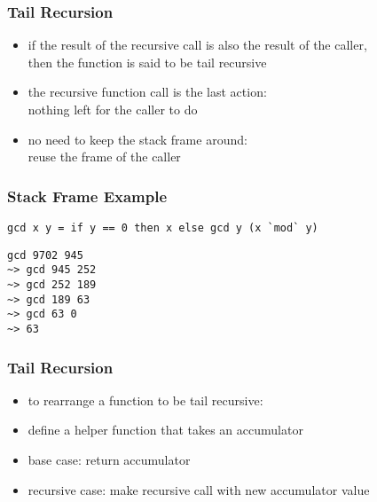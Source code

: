 \documentclass[dvipsnames]{beamer}
\theoremstyle{plain}
\begin{document}
\begin{frame}
  \frametitle{Tail Recursion}

  \begin{itemize}
    \item if the result of the recursive call is also the result of the caller,\\
      then the function is said to be \alert{tail recursive}
    \item the recursive function call is the last action:\\
      nothing left for the caller to do

    \pause
    \medskip
    \item no need to keep the stack frame around:\\
      reuse the frame of the caller
  \end{itemize}
\end{frame}

\begin{frame}[fragile]
  \frametitle{Stack Frame Example}

  \begin{lstlisting}
gcd x y = if y == 0 then x else gcd y (x `mod` y)
  \end{lstlisting}

  \lstinline|gcd 9702 945|\\
  \lstinline|~> gcd 945 252|\\
  \lstinline|~> gcd 252 189|\\
  \lstinline|~> gcd 189 63|\\
  \lstinline|~> gcd 63 0|\\
  \lstinline|~> 63|\\
\end{frame}

\begin{frame}
  \frametitle{Tail Recursion}

  \begin{itemize}
    \item to rearrange a function to be tail recursive:

    \medskip
    \item define a helper function that takes an \alert{accumulator}
    \item base case: return accumulator
    \item recursive case: make recursive call with new accumulator value
  \end{itemize}
\end{frame}
\end{document}
